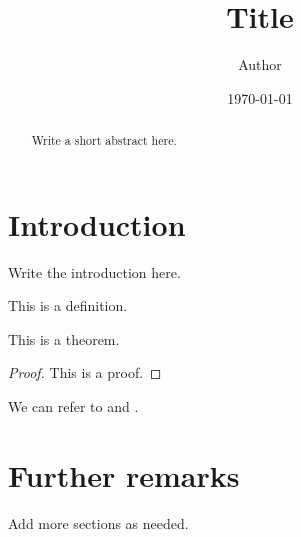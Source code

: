 \documentclass[12pt,a4paper]{amsart}
\title[Short title]{Title}
\author[Author]{Author}
\date{\today}
\begin{document}
\begin{abstract}
Write a short abstract here.
\end{abstract}

\maketitle

\tableofcontents

\section{Introduction}

Write the introduction here.

\begin{definition}\label{definition:sample}
This is a definition.
\end{definition}

\begin{theorem}\label{theorem:sample}
This is a theorem.
\end{theorem}

\begin{proof}
This is a proof.
\end{proof}

We can refer to  and .

\section{Further remarks}

Add more sections as needed.

\printbibliography
\end{document}
